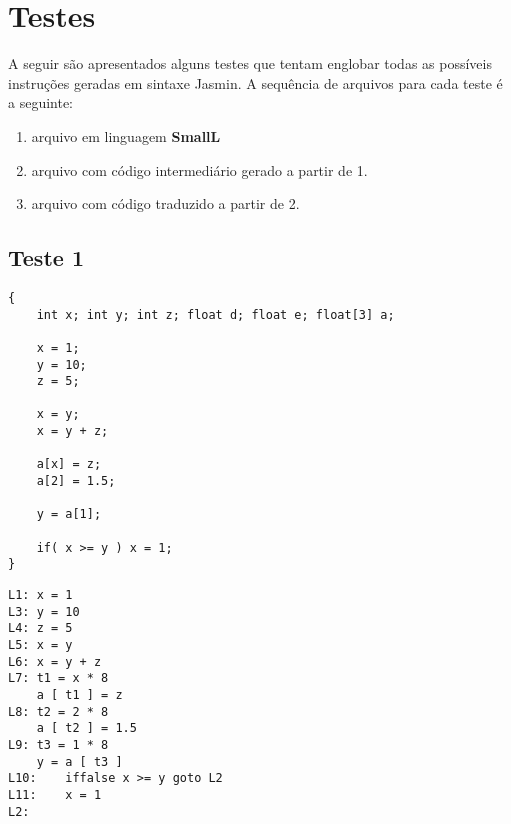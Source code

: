 \section{Testes}

A seguir são apresentados alguns testes que tentam englobar todas as possíveis instruções geradas em sintaxe Jasmin. A sequência de arquivos para cada teste é a seguinte:

\begin{enumerate}
\item arquivo em linguagem \textbf{SmallL}
\item arquivo com código intermediário gerado a partir de 1.
\item arquivo com código traduzido a partir de 2.
\end{enumerate}


\subsection{Teste 1}

\begin{lstlisting}[caption=Arquivo para o teste 1 em linguagem SmallL]
{
    int x; int y; int z; float d; float e; float[3] a;
    
    x = 1;
    y = 10;
    z = 5;
    
    x = y;
    x = y + z;

    a[x] = z;
    a[2] = 1.5;

    y = a[1];

    if( x >= y ) x = 1;
}
\end{lstlisting}

\begin{lstlisting}[caption=Arquivo com código intermediário para o teste 1 produzido pelo front-end]
L1:	x = 1
L3:	y = 10
L4:	z = 5
L5:	x = y
L6:	x = y + z
L7:	t1 = x * 8
    a [ t1 ] = z
L8:	t2 = 2 * 8
    a [ t2 ] = 1.5
L9:	t3 = 1 * 8
    y = a [ t3 ]
L10:	iffalse x >= y goto L2
L11:	x = 1
L2:
\end{lstlisting}

